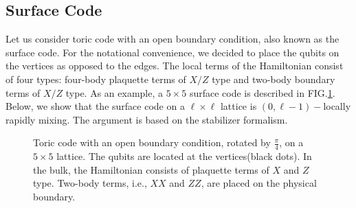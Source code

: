 \documentclass[prx,aps,amsmath,amssymb,floatfix,superscriptaddress,11pt,tightenlines,longbibliography,onecolumn,notitlepage]{revtex4-1}
\begin{document}
\subsection{Surface Code}
Let us consider toric code with an open boundary condition, also known as the surface code. For the notational convenience, we decided to place the qubits on the vertices as opposed to the edges. The local terms of the Hamiltonian consist of four types: four-body plaquette terms of $X/Z$ type and two-body boundary terms of $X/Z$ type. As an example, a $5\times 5$ surface code is described in FIG.\ref{fig:RSC}. Below, we show that the surface code on a $\ell \times \ell$ lattice is $(0,\ell-1)-$locally rapidly mixing. The argument is based on the stabilizer formalism\cite{Gottesman1997}.
\begin{figure}[h]
\caption{Toric code with an open boundary condition, rotated by $\frac{\pi}{4}$, on a $5\times 5$ lattice. The qubits are located at the vertices(black dots). In the bulk, the Hamiltonian consists of plaquette terms of $X$ and $Z$ type. Two-body terms, i.e., $XX$ and $ZZ$, are placed on the physical boundary.  \label{fig:RSC}}
\end{figure}
\end{document}
